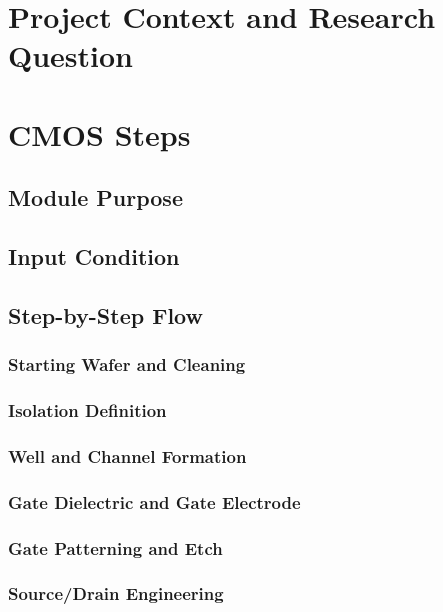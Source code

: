 \documentclass[11pt,a4paper]{report}
\begin{document}
\setcounter{tocdepth}{1}
\tableofcontents
\clearpage
{}

\chapter{Project Context and Research Question}


\chapter{CMOS Steps}
\label{chap:cmos}

\section{Module Purpose}

\section{Input Condition}

\section{Step-by-Step Flow}
\subsection{Starting Wafer and Cleaning}
\subsection{Isolation Definition}
\subsection{Well and Channel Formation}
\subsection{Gate Dielectric and Gate Electrode}
\subsection{Gate Patterning and Etch}
\subsection{Source/Drain Engineering}
\end{document}
